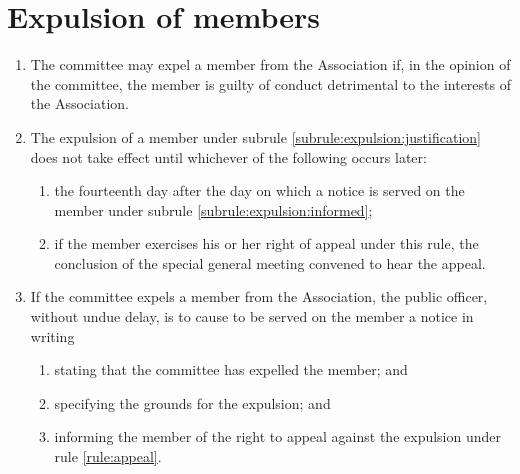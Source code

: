 \section{Expulsion of members}
\label{rule:expulsion}

\begin{enumerate}
	\item \label{subrule:expulsion:justification} The committee may expel a member from the Association if, in the opinion of the committee, the member is guilty of conduct detrimental to the interests of the Association.

	\item The expulsion of a member under subrule \ref{subrule:expulsion:justification} does not take effect until whichever of the following occurs later:
		\begin{enumerate}
			\item the fourteenth day after the day on which a notice is served on the member under subrule \ref{subrule:expulsion:informed};
			\item if the member exercises his or her right of appeal under this rule, the conclusion of the special general meeting convened to hear the appeal.
		\end{enumerate}
		
	\item \label{subrule:expulsion:informed} If the committee expels a member from the Association, the public officer, without undue delay, is to cause to be served on the member a notice in writing
		\begin{enumerate}
			\item stating that the committee has expelled the member; and
			\item specifying the grounds for the expulsion; and
			\item informing the member of the right to appeal against the expulsion under rule \ref{rule:appeal}.
		\end{enumerate}
\end{enumerate}